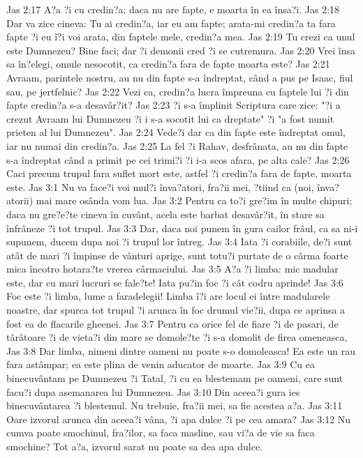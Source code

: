 Jas 2:17  A?a ?i cu credin?a: daca nu are fapte, e moarta în ea însa?i.
Jas 2:18  Dar va zice cineva: Tu ai credin?a, iar eu am fapte; arata-mi credin?a ta fara fapte ?i eu î?i voi arata, din faptele mele, credin?a mea.
Jas 2:19  Tu crezi ca unul este Dumnezeu? Bine faci; dar ?i demonii cred ?i se cutremura.
Jas 2:20  Vrei însa sa în?elegi, omule nesocotit, ca credin?a fara de fapte moarta este?
Jas 2:21  Avraam, parintele nostru, au nu din fapte s-a îndreptat, când a pus pe Isaac, fiul sau, pe jertfelnic?
Jas 2:22  Vezi ca, credin?a lucra împreuna cu faptele lui ?i din fapte credin?a s-a desavâr?it?
Jas 2:23  ?i s-a împlinit Scriptura care zice: "?i a crezut Avraam lui Dumnezeu ?i i s-a socotit lui ca dreptate" ?i "a fost numit prieten al lui Dumnezeu".
Jas 2:24  Vede?i dar ca din fapte este îndreptat omul, iar nu numai din credin?a.
Jas 2:25  La fel ?i Rahav, desfrânata, au nu din fapte s-a îndreptat când a primit pe cei trimi?i ?i i-a scos afara, pe alta cale?
Jas 2:26  Caci precum trupul fara suflet mort este, astfel ?i credin?a fara de fapte, moarta este.
Jas 3:1  Nu va face?i voi mul?i înva?atori, fra?ii mei, ?tiind ca (noi, înva?atorii) mai mare osânda vom lua.
Jas 3:2  Pentru ca to?i gre?im în multe chipuri; daca nu gre?e?te cineva în cuvânt, acela este barbat desavâr?it, în stare sa înfrâneze ?i tot trupul.
Jas 3:3  Dar, daca noi punem în gura cailor frâul, ca sa ni-i supunem, ducem dupa noi ?i trupul lor întreg.
Jas 3:4  Iata ?i corabiile, de?i sunt atât de mari ?i împinse de vânturi aprige, sunt totu?i purtate de o cârma foarte mica încotro hotara?te vrerea cârmaciului.
Jas 3:5  A?a ?i limba: mic madular este, dar cu mari lucruri se fale?te! Iata pu?in foc ?i cât codru aprinde!
Jas 3:6  Foc este ?i limba, lume a faradelegii! Limba î?i are locul ei între madularele noastre, dar spurca tot trupul ?i arunca în foc drumul vie?ii, dupa ce aprinsa a fost ea de flacarile gheenei.
Jas 3:7  Pentru ca orice fel de fiare ?i de pasari, de târâtoare ?i de vieta?i din mare se domole?te ?i s-a domolit de firea omeneasca,
Jas 3:8  Dar limba, nimeni dintre oameni nu poate s-o domoleasca! Ea este un rau fara astâmpar; ea este plina de venin aducator de moarte.
Jas 3:9  Cu ea binecuvântam pe Dumnezeu ?i Tatal, ?i cu ea blestemam pe oameni, care sunt facu?i dupa asemanarea lui Dumnezeu.
Jas 3:10  Din aceea?i gura ies binecuvântarea ?i blestemul. Nu trebuie, fra?ii mei, sa fie acestea a?a.
Jas 3:11  Oare izvorul arunca din aceea?i vâna, ?i apa dulce ?i pe cea amara?
Jas 3:12  Nu cumva poate smochinul, fra?ilor, sa faca masline, sau vi?a de vie sa faca smochine? Tot a?a, izvorul sarat nu poate sa dea apa dulce.
